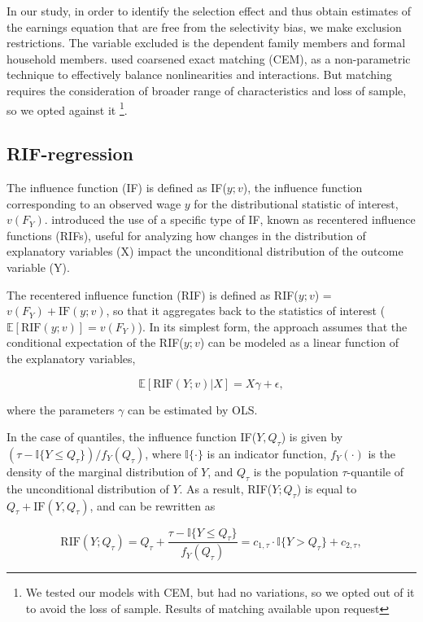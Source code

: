 In our study, in order to identify the selection effect and thus obtain estimates of the earnings equation that are free from the selectivity bias, we make exclusion restrictions. The variable excluded is the dependent family members and formal household members. \textcite{Baum2024} used coarsened exact matching (CEM), as a non-parametric technique to effectively balance nonlinearities and interactions. But matching requires the consideration of broader range of characteristics and loss of sample, so we opted against it \footnote{We tested our models with CEM, but had no variations, so we opted out of it to avoid the loss of sample. Results of matching available upon request}. 

\subsection{RIF-regression}
The influence function (IF) is defined as IF($y; v$), the influence function corresponding to an observed wage $y$ for the distributional statistic of interest, $v(F_Y)$.
\textcite{Firpo2009} introduced the use of a specific type of IF, known as recentered influence functions (RIFs), useful for analyzing how changes in the distribution of explanatory variables (X) impact the unconditional distribution of the outcome variable (Y).

 The recentered influence function (RIF) is defined as RIF($y; v$) = $v(F_Y) + \text{IF}(y; v)$, so that it aggregates back to the statistics of interest ($\mathbb{E}[\text{RIF}(y; v)] = v(F_Y)$). In its simplest form, the approach assumes that the conditional expectation of the RIF($y; v$) can be modeled as a linear function of the explanatory variables,

\begin{equation}
	\mathbb{E}[\text{RIF}(Y; v)|X] = X \gamma + \epsilon,
\end{equation}

where the parameters $\gamma$ can be estimated by OLS.

In the case of quantiles, the influence function IF($Y, Q_\tau$) is given by $(\tau - \mathbb{I}\{Y \leq Q_\tau\}) / f_Y(Q_\tau)$, where $\mathbb{I}\{\cdot\}$ is an indicator function, $f_Y(\cdot)$ is the density of the marginal distribution of $Y$, and $Q_\tau$ is the population $\tau$-quantile of the unconditional distribution of $Y$. As a result, RIF($Y; Q_\tau$) is equal to $Q_\tau + \text{IF}(Y, Q_\tau)$, and can be rewritten as

\begin{equation}
	\text{RIF}(Y; Q_\tau) = Q_\tau + \frac{\tau - \mathbb{I}\{Y \leq Q_\tau\}}{f_Y(Q_\tau)} = c_{1,\tau} \cdot \mathbb{I}\{Y > Q_\tau\} + c_{2,\tau},
\end{equation}

